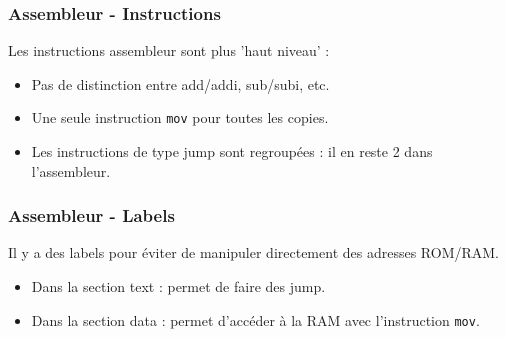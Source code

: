 \documentclass[xcolor=pst,10pt,onlymath]{beamer}
\begin{document}
\begin{frame}
    \frametitle{Assembleur - Instructions}
    Les instructions assembleur sont plus 'haut niveau' :
    \begin{itemize}
        \item Pas de distinction entre add/addi, sub/subi, etc.
        \item Une seule instruction \texttt{mov} pour toutes les copies.
        \item Les instructions de type jump sont regroupées : il en reste 2 dans l'assembleur.
    \end{itemize}
\end{frame}

\begin{frame}
    \frametitle{Assembleur - Labels}
    Il y a des labels pour éviter de manipuler directement des adresses ROM/RAM.
    \begin{itemize}
        \item Dans la section text : permet de faire des jump.
        \item Dans la section data : permet d'accéder à la RAM avec l'instruction \texttt{mov}.
    \end{itemize}
\end{frame}
\end{document}
